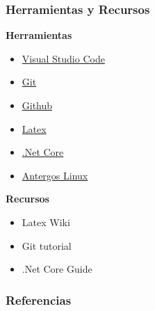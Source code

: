 \documentclass{beamer}
\begin{document}
\begin{frame}
\frametitle{Herramientas y Recursos}
\begin{multicols*}{2}
    {\bf Herramientas} \\
\begin{itemize}
    \item \href{https://code.visualstudio.com/}{Visual Studio Code}
    \item \href{https://git-scm.com/}{Git}
    \item \href{https://github.com/}{Github}
    \item \href{https://www.latex-project.org/}{Latex}
    \item \href{https://dotnet.github.io/}{.Net Core}
    \item \href{https://antergos.com/}{Antergos Linux}

\end{itemize}
\columnbreak
{\bf Recursos}
\begin{itemize}
    \item Latex Wiki \cite{Latex}
    \item Git tutorial \cite{GitTutorial}
    \item .Net Core Guide \cite{DotNetGuide}
\end{itemize}
\end{multicols*}
\end{frame}

\begin{frame}
\frametitle{Referencias}


\end{frame}
\end{document}
